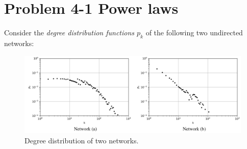 \section{Problem 4-1 Power laws}

Consider the \textit{degree distribution functions $p_k$} of the following two undirected networks:

\begin{figure}[h]
	\centering
	\includegraphics[width=0.9\linewidth]{images/problem41_degree_distribution_networks.png}
	\caption{Degree distribution of two networks.}
	\label{distribution}
\end{figure}

